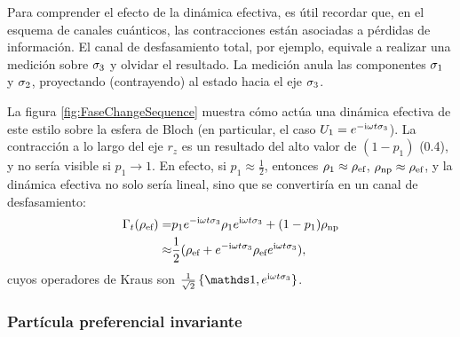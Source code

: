 Para comprender el efecto de la dinámica efectiva, es útil recordar que, en el esquema de canales cuánticos, las contracciones están asociadas a pérdidas de información. El canal de desfasamiento total, por ejemplo, equivale a realizar una medición sobre $\sigma_{3}$ y olvidar el resultado. La medición anula las componentes $\sigma_{1}$ y $\sigma_{2}$, proyectando (contrayendo) al estado hacia el eje $\sigma_{3}$.

La figura \ref{fig:FaseChangeSequence} muestra cómo actúa una dinámica efectiva de este estilo sobre la esfera de Bloch (en particular, el caso $U_{1}=e^{-\text{i}\omega t \sigma_{3}}$). La contracción a lo largo del eje $r_{z}$ es un resultado del alto valor de $(1-p_{1})$ (0.4), y no sería visible si $p_{1}\rightarrow 1$. En efecto, si $p_{1}\approx\frac{1}{2}$, entonces $\rho_{1}\approx\rho_{\text{ef}}$, $\rho_{\text{np}}\approx\rho_{\text{ef}}$, y la dinámica efectiva no solo sería lineal, sino que se convertiría en un canal de desfasamiento:
\begin{align}
    \Gamma_{t}(\rho_{\text{ef}})=&p_{1}e^{-\text{i}\omega t \sigma_{3}}\rho_{1}e^{\text{i}\omega t \sigma_{3}}+(1-p_{1})\rho_{\text{np}}\nonumber\\
    \approx&\frac{1}{2}(\rho_{\text{ef}}+e^{-\text{i}\omega t \sigma_{3}}\rho_{\text{ef}} e^{\text{i}\omega t \sigma_{3}}),\nonumber
\end{align}
cuyos operadores de Kraus son $\frac{1}{\sqrt{2}}\left\{\Id, e^{\rmi\omega t \pauli{3}} \right\}$.

\subsubsection{Partícula preferencial invariante}

